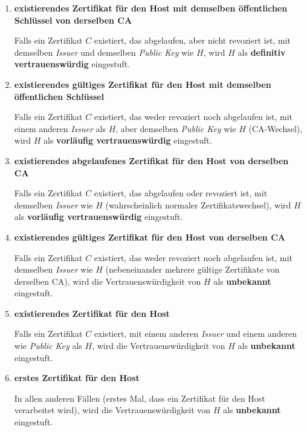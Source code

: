 \documentclass[accentcolor=tud1c,article,colorback,11pt]{tudreport}
\begin{document}
\begin{enumerate}

\item \textbf{existierendes Zertifikat für den Host mit demselben öffentlichen Schlüssel von derselben CA}

Falls ein Zertifikat $C$ existiert, das abgelaufen, aber nicht revoziert ist, mit demselben \emph{Issuer} und demselben \emph{Public Key} wie $H$, wird $H$ als \textbf{definitiv vertrauenswürdig} eingestuft.

\item \textbf{existierendes gültiges Zertifikat für den Host mit demselben öffentlichen Schlüssel}

Falls ein Zertifikat $C$ existiert, das weder revoziert noch abgelaufen ist, mit einem anderen \emph{Issuer} als $H$, aber demselben \emph{Public Key} wie $H$ (CA-Wechsel), wird $H$ als \textbf{vorläufig vertrauenswürdig} eingestuft.

\item \textbf{existierendes abgelaufenes Zertifikat für den Host von derselben CA}

Falls ein Zertifikat $C$ existiert, das abgelaufen oder revoziert ist, mit demselben \emph{Issuer} wie $H$ (wahrscheinlich normaler Zertifikatswechsel), wird $H$ als \textbf{vorläufig vertrauenswürdig} eingestuft.

\item \textbf{existierendes gültiges Zertifikat für den Host von derselben CA}

Falls ein Zertifikat $C$ existiert, das weder revoziert noch abgelaufen ist, mit demselben \emph{Issuer} wie $H$ (nebeneinander mehrere gültige Zertifikate von derselben CA), wird die Vertrauenswürdigkeit von $H$ als \textbf{unbekannt} eingestuft.

\item \textbf{existierendes Zertifikat für den Host}

Falls ein Zertifikat $C$ existiert, mit einem anderen \emph{Issuer} und einem anderen wie \emph{Public Key} als $H$, wird die Vertrauenswürdigkeit von $H$ als \textbf{unbekannt} eingestuft.

\item \textbf{erstes Zertifikat für den Host}

In allen anderen Fällen (erstes Mal, dass ein Zertifikat für den Host verarbeitet wird), wird die Vertrauenswürdigkeit von $H$ als \textbf{unbekannt} eingestuft.

\end{enumerate}
\end{document}
